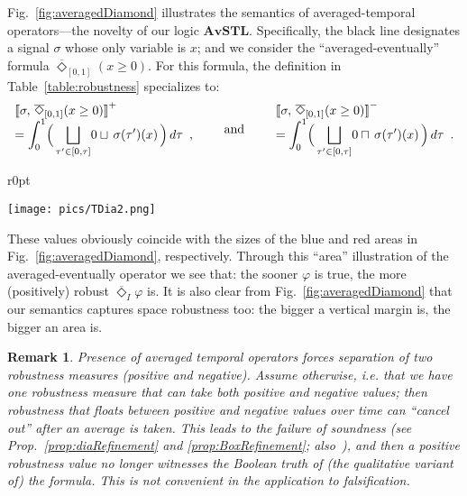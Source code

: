 \documentclass[envcountsect,orivec]{llncs} \usepackage{etex} \usepackage[]{graphicx}
\newtheorem{myremark}[mytheorem]{Remark}
\newcommand{\TDiaOp}[1]{\overline{\Diamond}_{#1}}
\newcommand{\Robust}[2]{{ \llbracket #1,\, #2 \rrbracket}}
\newcommand{\Vee}[1]{{{\bigsqcup_{#1}}}}
\newcommand{\Int}{\displaystyle \int}
\newcommand{\AvSTL}{\textbf{AvSTL}}
\begin{document}
Fig.~\ref{fig:averagedDiamond} illustrates the semantics of 
averaged-temporal operators---the novelty of our logic $\AvSTL$. Specifically, 
the black line designates a
signal $\sigma$ whose only variable is $x$; and we consider the ``averaged-eventually''
formula $\TDiaOp{[0, 1]} (x \geq 0)$. For this formula, the definition in
Table~\ref{table:robustness} specializes to:
\[
  \begin{array}{l}
    \Robust{\sigma}{\TDiaOp{[0, 1]} (x \geq 0)}^{+} \\
    =
    \Int_{0}^{1} \Bigl(\,\Vee{\tau' \in [0 , \tau]} 0\sqcup\,
    \sigma(\tau')(x)\,\Bigr) \,d\tau\enspace, 
  \end{array}
  \qquad\text{and}\qquad
  \begin{array}{l}
    \Robust{\sigma}{\TDiaOp{[0, 1]} (x \geq 0)}^{-}
    \\
    =
    \Int_{0}^{1}\Bigl(\, \Vee{\tau' \in [0 , \tau]} 0
    \sqcap\,\sigma(\tau')(x) 
    \,\Bigr)\,d\tau\enspace .
  \end{array}
\]
\begin{wrapfigure}[8]{r}{0pt}
\begin{minipage}[r]{.4\textwidth}
  \centering
\texttt{[image: pics/TDia2.png]}
\caption{
    The positive and negative robustness of 
    $\TDiaOp{[0, 1]} (x \geq 0)$ at $t=0$.}
  \label{fig:averagedDiamond}


  \end{minipage}
\end{wrapfigure}
These values obviously coincide with the sizes of the blue and red
areas in Fig.~\ref{fig:averagedDiamond}, respectively. Through this ``area''
illustration 
of the averaged-eventually operator 
we see that: the sooner
$\varphi$ is true, the more (positively) robust $\TDiaOp{I}\varphi$ is.
It is also clear from Fig.~\ref{fig:averagedDiamond} that our semantics captures space robustness
too: the bigger a vertical margin is, the bigger an area is.

\begin{myremark}\label{rem:separationPosNegRobustness}
Presence of averaged temporal operators forces separation of two
 robustness measures (positive and negative). Assume otherwise, i.e.
 that we have one robustness measure
that can take both positive and negative values; then robustness that floats  between
positive and negative values over time
can ``cancel out'' after an average is taken. This leads to the failure
of \emph{soundness} (see Prop.~\ref{prop:diaRefinement} and \ref{prop:BoxRefinement};
also~\cite{DBLP:journals/tcs/FainekosP09,DBLP:conf/formats/DonzeM10}),
and then a positive robustness value no longer witnesses the Boolean truth
of  (the qualitative variant of) the formula. This is not convenient in
 the application to falsification.
\end{myremark}
\end{document}
